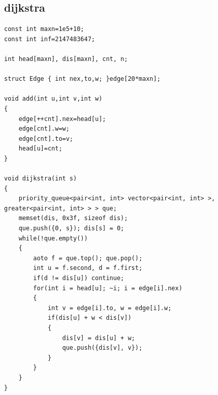 \documentclass[twoside]{article}
\begin{document}
\subsection{dijkstra}
\begin{lstlisting}
const int maxn=1e5+10;
const int inf=2147483647;

int head[maxn], dis[maxn], cnt, n;

struct Edge { int nex,to,w; }edge[20*maxn];

void add(int u,int v,int w)
{
    edge[++cnt].nex=head[u];
    edge[cnt].w=w;
    edge[cnt].to=v;
    head[u]=cnt;
}

void dijkstra(int s)
{
    priority_queue<pair<int, int> vector<pair<int, int> >, greater<pair<int, int> > > que;
    memset(dis, 0x3f, sizeof dis);
    que.push({0, s}); dis[s] = 0;
    while(!que.empty())
    {
        aoto f = que.top(); que.pop();
        int u = f.second, d = f.first;
        if(d != dis[u]) continue;
        for(int i = head[u]; ~i; i = edge[i].nex)
        {
            int v = edge[i].to, w = edge[i].w;
            if(dis[u] + w < dis[v])
            {
                dis[v] = dis[u] + w;
                que.push({dis[v], v});
            }
        }
    }
}
\end{lstlisting}
\end{document}
